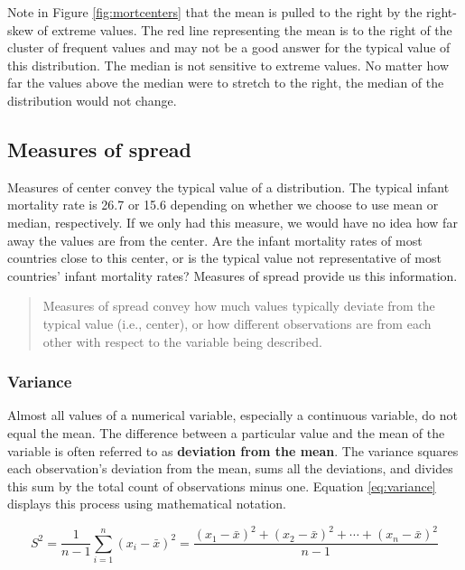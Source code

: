 \documentclass[
]{book}
\begin{document}
Note in Figure \ref{fig:mortcenters} that the mean is pulled to the right by the right-skew of extreme values. The red line representing the mean is to the right of the cluster of frequent values and may not be a good answer for the typical value of this distribution. The median is not sensitive to extreme values. No matter how far the values above the median were to stretch to the right, the median of the distribution would not change.

\hypertarget{measures-of-spread}{%
\subsection{Measures of spread}\label{measures-of-spread}}

Measures of center convey the typical value of a distribution. The typical infant mortality rate is 26.7 or 15.6 depending on whether we choose to use mean or median, respectively. If we only had this measure, we would have no idea how far away the values are from the center. Are the infant mortality rates of most countries close to this center, or is the typical value not representative of most countries' infant mortality rates? Measures of spread provide us this information.

\begin{quote}
Measures of spread convey how much values typically deviate from the typical value (i.e., center), or how different observations are from each other with respect to the variable being described.
\end{quote}

\hypertarget{variance}{%
\subsubsection*{Variance}\label{variance}}


Almost all values of a numerical variable, especially a continuous variable, do not equal the mean. The difference between a particular value and the mean of the variable is often referred to as \textbf{deviation from the mean}. The variance squares each observation's deviation from the mean, sums all the deviations, and divides this sum by the total count of observations minus one. Equation \eqref{eq:variance} displays this process using mathematical notation.

\begin{equation}
{\displaystyle S^2={\frac {1}{n-1}}\sum _{i=1}^{n}(x_{i}-\bar{x})^2={\frac {(x_{1}-\bar{x})^2+(x_{2}-\bar{x})^2+\cdots +(x_{n}-\bar{x})^2}{n-1}}}
\label{eq:variance}
\end{equation}
\end{document}
